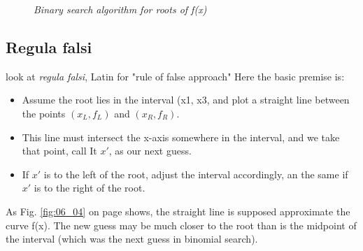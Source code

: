 \begin{figure}
    \caption{\textit{Binary search algorithm for roots of f(x)}}
    \label{fig:06_03}
\end{figure}




\subsection{Regula falsi}

 look at \textit{regula falsi}, Latin for "rule of false approach" Here the basic premise is:

\begin{itemize}
    \item Assume the root lies in the interval (x1, x3, and plot a straight line between the points $(x_L, f_L)$ and $(x_R, f_R)$.

    \item This line must intersect the x-axis somewhere in the interval, and we take that point, call It $x'$, as our next guess.

    \item If $x'$ is to the left of the root, adjust the interval accordingly, an the same if $x'$ is to the right of the root.
\end{itemize}

As Fig. \ref{fig:06_04} on page \pageref{fig:06_04} shows, the straight line is supposed
approximate the curve f(x). The new guess may be much closer to the root than is the midpoint of the interval (which was the next guess in binomial search).

